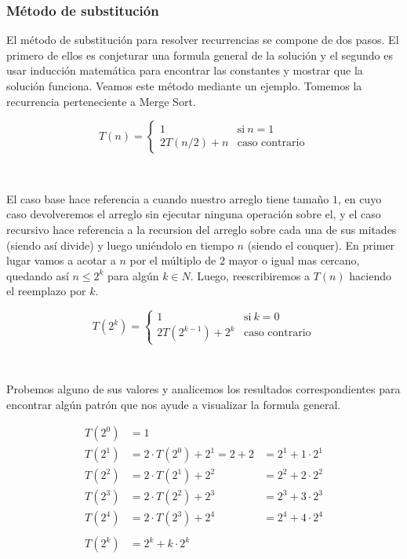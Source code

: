 \subsubsection{M\'etodo de substituci\'on}

El m\'etodo de substituci\'on para resolver recurrencias se compone de dos pasos. El primero de ellos es conjeturar una formula general de la soluci\'on y el segundo es usar inducci\'on matem\'atica para encontrar las constantes y mostrar que la soluci\'on funciona. Veamos este m\'etodo mediante un ejemplo. Tomemos la recurrencia perteneciente a Merge Sort.

\begin{equation*}
  T(n) = \begin{cases}
	      1         		& \text{si} \ n = 1 \\
	      2T(n/2) + n         	& \text{caso contrario}
	  \end{cases}
\end{equation*}

~

El caso base hace referencia a cuando nuestro arreglo tiene tama\~no $1$, en cuyo caso devolveremos el arreglo sin ejecutar ninguna operaci\'on sobre el, y el caso recursivo hace referencia a la recursion del arreglo sobre cada una de sus mitades (siendo as\'i divide) y luego uni\'endolo en tiempo $n$ (siendo el conquer). En primer lugar vamos a acotar a $n$ por el m\'ultiplo de $2$ mayor o igual mas cercano, quedando as\'i $n \leq 2^k$ para alg\'un $k \in N$. Luego, reescribiremos a $T(n)$ haciendo el reemplazo por $k$.

\begin{equation*}
  T(2^k) = \begin{cases}
	      1         		& \text{si} \ k = 0 \\
	      2T(2^{k-1}) + 2^k        	& \text{caso contrario}
	  \end{cases}
\end{equation*}

~

Probemos alguno de sus valores y analicemos los resultados correspondientes para encontrar alg\'un patr\'on que nos ayude a visualizar la formula general.

\begin{align*}
 T(2^0) & = 1 \\
 T(2^1) & = 2 \cdot T(2^0) + 2^1 = 2 + 2 & = 2^1 + 1 \cdot 2^1 \\
 T(2^2) & = 2 \cdot T(2^1) + 2^2 & = 2^2 + 2 \cdot 2^2 \\
 T(2^3) & = 2 \cdot T(2^2) + 2^3 &= 2^3 + 3 \cdot 2^3 \\
 T(2^4) & = 2 \cdot T(2^3) + 2^4 &= 2^4 + 4 \cdot 2^4 \\ \\
 T(2^k) & = 2^k + k \cdot 2^k
\end{align*}

